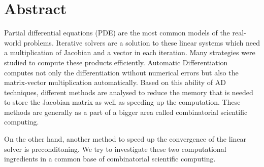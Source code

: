\documentclass[12pt, oneside]{book}
\begin{document}
\begin{center}
\end{center}
\tableofcontents

\newpage
\section*{Abstract}
Partial differential equations (PDE) are the most common models of the real-world problems.
Iterative solvers are a solution to these linear systems which need a multiplication
 of Jacobian and a vector in each iteration. 
Many strategies were studied to compute these products efficiently.
Automatic Differentiation~\cite{Griewank2008EDP,Rall1981ADT} 
computes not only the differentiation wtihout numerical errors but also the
matrix-vector multiplication automatically. 
Based on this ability of AD techniques, different methods are analysed to 
reduce the memory that is needed to store the Jacobian matrix as well as
speeding up the computation. These methods are generally as a part of 
a bigger area called combinatorial scientific computing.

On the other hand, another method to speed up the convergence of the linear solver
is preconditoning. We try to investigate these two computational ingredients
in a common base of combinatorial scientific computing. 
\end{document}
